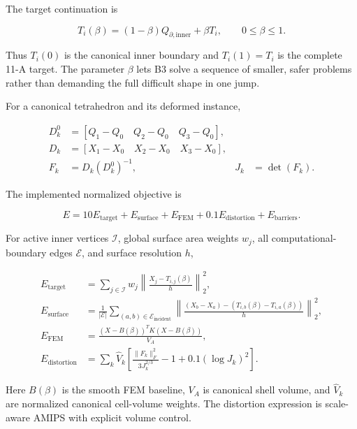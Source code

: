\documentclass[11pt]{article}
\begin{document}
The target continuation is

\begin{equation}
  T_i(\beta)=(1-\beta)Q_{\partial,\mathrm{inner}}+\beta T_i,
  \qquad 0\le\beta\le1.
\end{equation}

Thus $T_i(0)$ is the canonical inner boundary and $T_i(1)=T_i$ is the complete 11-A
target. The parameter $\beta$ lets B3 solve a sequence of smaller, safer problems rather
than demanding the full difficult shape in one jump.

For a canonical tetrahedron and its deformed instance,

\begin{align}
  D_k^0 &= [Q_1-Q_0\quad Q_2-Q_0\quad Q_3-Q_0],\\
  D_k   &= [X_1-X_0\quad X_2-X_0\quad X_3-X_0],\\
  F_k   &= D_k(D_k^0)^{-1},
  &J_k&=\det(F_k).
  \label{eq:deformation-gradient}
\end{align}

The implemented normalized objective is

\begin{equation}
  E=10E_{\mathrm{target}}+E_{\mathrm{surface}}+E_{\mathrm{FEM}}
    +0.1E_{\mathrm{distortion}}+E_{\mathrm{barriers}}.
  \label{eq:b3-total}
\end{equation}

For active inner vertices $\mathcal I$, global surface area weights $w_j$, all
computational-boundary edges $\mathcal E$, and surface resolution $h$,

\begin{align}
E_{\mathrm{target}}
  &=\sum_{j\in\mathcal I}w_j
    \left\|\frac{X_j-T_{i,j}(\beta)}{h}\right\|_2^2,\\
E_{\mathrm{surface}}
  &=\frac{1}{|\mathcal E|}
    \sum_{(a,b)\in\mathcal E_{\mathrm{incident}}}
    \left\|
    \frac{(X_b-X_a)-(T_{i,b}(\beta)-T_{i,a}(\beta))}{h}
    \right\|_2^2,\\
E_{\mathrm{FEM}}
  &=\frac{(X-B(\beta))^T K(X-B(\beta))}{V_A},\\
E_{\mathrm{distortion}}
  &=\sum_k \widehat V_k\left[
    \frac{\|F_k\|_F^2}{3J_k^{2/3}}-1+0.1(\log J_k)^2
    \right].
  \label{eq:b3-components}
\end{align}

Here $B(\beta)$ is the smooth FEM baseline, $V_A$ is canonical shell volume, and
$\widehat V_k$ are normalized canonical cell-volume weights. The distortion expression
is scale-aware AMIPS with explicit volume control.
\end{document}
